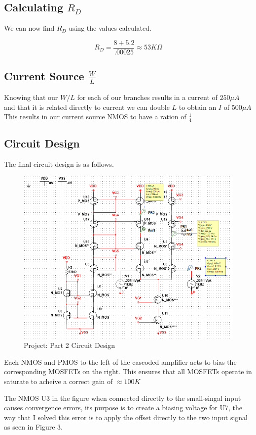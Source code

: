 \documentclass[12pt]{article}
\begin{document}
	\subsection{Calculating $R_D$}
	We can now find $R_D$ using the values calculated.
	
	$$R_D = \frac{8 + 5.2}{.00025} \approx 53K \Omega$$
	
	\subsection{Current Source $\frac{W}{L}$}
	Knowing that our $W/L$ for each of our branches results in a current of $250 \mu A$ and that it is related directly to current we can double $L$ to obtain an $I$ of $500\mu A$ This results in our current source NMOS to have a ration of $\frac{1}{4}$
	
	
	\subsection{Circuit Design}
	The final circuit design is as follows. 
		\begin{figure}[h!]
		\label{fig:amp}
		\caption{Project: Part 2 Circuit Design}
		\centering
		\includegraphics[width=1\textwidth]{fullcircuit}
	\end{figure}

	Each NMOS and PMOS to the left of the cascoded amplifier acts to bias the corresponding MOSFETs on the right. This ensures that all MOSFETs operate in saturate to acheive a correct gain of $\approx 100K$
	
	The NMOS U3 in the figure when connected directly to the small-singal input causes convergence errors, its purpose is to create a biasing voltage for U7, the way that I solved this error is to apply the offset directly to the two input signal as seen in Figure 3. 
	
\end{document}
